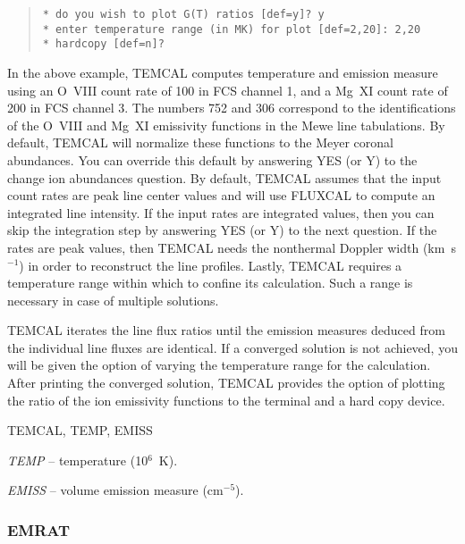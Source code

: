 {{{\begin{quote}
\begin{verbatim}
* do you wish to plot G(T) ratios [def=y]? y
* enter temperature range (in MK) for plot [def=2,20]: 2,20
* hardcopy [def=n]?
\end{verbatim}
\end{quote}
In the above example, TEMCAL computes temperature and emission measure using an
O~VIII count rate of 100 in FCS channel 1, and a Mg~XI count rate of 200 in FCS
channel 3. The numbers 752 and 306 correspond to the identifications of the
O~VIII and Mg~XI emissivity functions in the Mewe line tabulations. By default,
TEMCAL will normalize these functions to the Meyer coronal abundances. You  can
override this default by answering YES (or Y) to the change ion abundances 
question. By default, TEMCAL assumes that  the input count rates are peak line
center values and will use FLUXCAL to compute an integrated line intensity. If
the input rates are integrated values, then you can skip the integration step
by answering YES (or Y) to the next question. If the rates are peak values,
then  TEMCAL needs the nonthermal Doppler width (km~s$^{-1}$)  in order to
reconstruct the line profiles.  Lastly, TEMCAL requires a temperature range
within which to  confine its calculation. Such a range is necessary in case of
multiple solutions.

TEMCAL iterates the line flux ratios until the emission measures deduced from
the individual line fluxes are identical. If a converged solution is not
achieved, you will be given the option of varying the temperature range for the
calculation. After printing the converged solution, TEMCAL provides the option
of plotting the ratio of the ion emissivity functions to the terminal and a
hard copy device.


TEMCAL, TEMP, EMISS


{\it TEMP} -- temperature (10$^6$~K).

{\it EMISS} -- volume emission measure (cm$^{-5}$).

\subsubsection{EMRAT}

}}}
